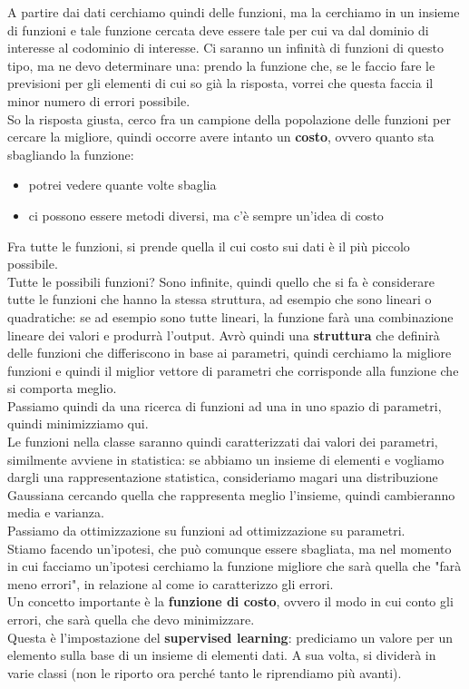 \documentclass[12pt, oneside]{extbook}
\begin{document}
A partire dai dati cerchiamo quindi delle funzioni, ma la cerchiamo in un insieme di funzioni e tale funzione cercata deve essere tale per cui va dal dominio di interesse al codominio di interesse. Ci saranno un infinità di funzioni di questo tipo, ma ne devo determinare una: prendo la funzione che, se le faccio fare le previsioni per gli elementi di cui so già la risposta, vorrei che questa faccia il minor numero di errori possibile.\\So la risposta giusta, cerco fra un campione della popolazione delle funzioni per cercare la migliore, quindi occorre avere intanto un \textbf{costo}, ovvero quanto sta sbagliando la funzione:
\begin{itemize}
	\item potrei vedere quante volte sbaglia
	\item ci possono essere metodi diversi, ma c'è sempre un'idea di costo
\end{itemize}
Fra tutte le funzioni, si prende quella il cui costo sui dati è il più piccolo possibile.\\Tutte le possibili funzioni? Sono infinite, quindi quello che si fa è considerare tutte le funzioni che hanno la stessa struttura, ad esempio che sono lineari o quadratiche: se ad esempio sono tutte lineari, la funzione farà una combinazione lineare dei valori e produrrà l'output. Avrò quindi una \textbf{struttura} che definirà delle funzioni che differiscono in base ai parametri, quindi cerchiamo la migliore funzioni e quindi il miglior vettore di parametri che corrisponde alla funzione che si comporta meglio.\\Passiamo quindi da una ricerca di funzioni ad una in uno spazio di parametri, quindi minimizziamo qui.\\Le funzioni nella classe saranno quindi caratterizzati dai valori dei parametri, similmente avviene in statistica: se abbiamo un insieme di elementi e vogliamo dargli una rappresentazione statistica, consideriamo magari una distribuzione Gaussiana cercando quella che rappresenta meglio l'insieme, quindi cambieranno media e varianza.\\Passiamo da ottimizzazione su funzioni ad ottimizzazione su parametri.\\Stiamo facendo un'ipotesi, che può comunque essere sbagliata, ma nel momento in cui facciamo un'ipotesi cerchiamo la funzione migliore che sarà quella che "farà meno errori", in relazione al come io caratterizzo gli errori.\\Un concetto importante è la \textbf{funzione di costo}, ovvero il modo in cui conto gli errori, che sarà quella che devo minimizzare.\\Questa è l'impostazione del \textbf{supervised learning}: prediciamo un valore per un elemento sulla base di un insieme di elementi dati. A sua volta, si dividerà in varie classi (non le riporto ora perché tanto le riprendiamo più avanti).
	
	
	
	
	
	
	
	
	
	
	
	
	
	
	
	
	
	
	
	
	
\end{document}
